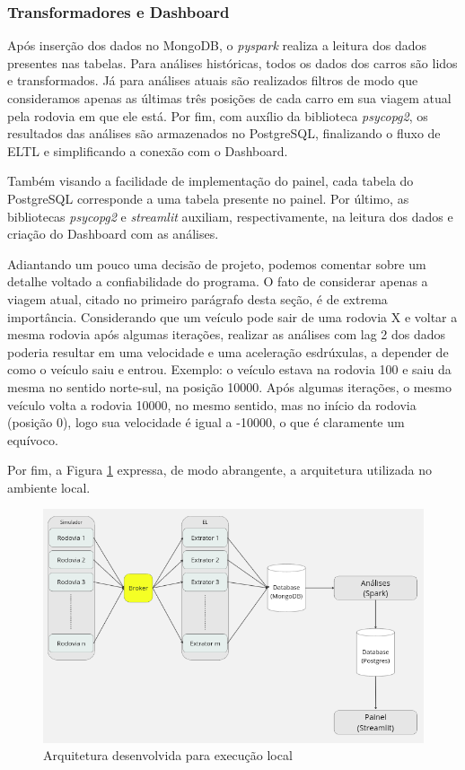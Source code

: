 \documentclass{article}
\begin{document}
\subsubsection*{Transformadores e Dashboard}

Após inserção dos dados no MongoDB, o \textit{pyspark} realiza a leitura dos dados presentes nas tabelas. Para análises históricas, todos os dados dos carros são lidos e transformados. Já para análises atuais são realizados filtros de modo que consideramos apenas as últimas três posições de cada carro em sua viagem atual pela rodovia em que ele está. Por fim, com auxílio da biblioteca \textit{psycopg2}, os resultados das análises são armazenados no PostgreSQL, finalizando o fluxo de ELTL e simplificando a conexão com o Dashboard.

Também visando a facilidade de implementação do painel, cada tabela do PostgreSQL corresponde a uma tabela presente no painel. Por último, as bibliotecas \textit{psycopg2} e \textit{streamlit} auxiliam, respectivamente, na leitura dos dados e criação do Dashboard com as análises.

Adiantando um pouco uma decisão de projeto, podemos comentar sobre um detalhe voltado a confiabilidade do programa. O fato de considerar apenas a viagem atual, citado no primeiro parágrafo desta seção, é de extrema importância. Considerando que um veículo pode sair de uma rodovia X e voltar a mesma rodovia após algumas iterações, realizar as análises com lag 2 dos dados poderia resultar em uma velocidade e uma aceleração esdrúxulas, a depender de como o veículo saiu e entrou. Exemplo: o veículo estava na rodovia 100 e saiu da mesma no sentido norte-sul, na posição 10000. Após algumas iterações, o mesmo veículo volta a rodovia 10000, no mesmo sentido, mas no início da rodovia (posição 0), logo sua velocidade é igual a -10000, o que é claramente um equívoco.

Por fim, a Figura \ref{fig:arquitetura_ambiente_local} expressa, de modo abrangente, a arquitetura utilizada no ambiente local.

\begin{figure}[H]
    \centering
    \includegraphics[scale = 0.6]{images/Arquitetura_ambiente_local.png}
    \caption{Arquitetura desenvolvida para execução local}
    \label{fig:arquitetura_ambiente_local}
\end{figure}
\end{document}
